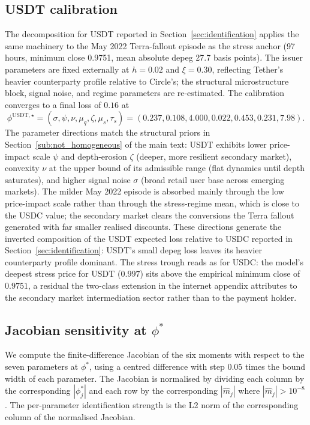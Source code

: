 \subsection{USDT calibration}\label{sub:usdt_calibration}

The decomposition for USDT reported in Section~\ref{sec:identification} applies the same machinery to the May 2022 Terra-fallout episode as the stress anchor (97 hours, minimum close 0.9751, mean absolute depeg 27.7 basis points). The issuer parameters are fixed externally at $h = 0.02$ and $\xi = 0.30$, reflecting Tether's heavier counterparty profile relative to Circle's; the structural microstructure block, signal noise, and regime parameters are re-estimated. The calibration converges to a final loss of $0.16$ at
\begin{equation}\label{eq:phi_star_usdt}
\phi^{\text{USDT},\star} = (\sigma, \psi, \nu, \mu_q, \zeta, \mu_s, \tau_s) = (0.237, 0.108, 4.000, 0.022, 0.453, 0.231, 7.98).
\end{equation}
The parameter directions match the structural priors in Section~\ref{sub:not_homogeneous} of the main text: USDT exhibits lower price-impact scale $\psi$ and depth-erosion $\zeta$ (deeper, more resilient secondary market), convexity $\nu$ at the upper bound of its admissible range (flat dynamics until depth saturates), and higher signal noise $\sigma$ (broad retail user base across emerging markets). The milder May 2022 episode is absorbed mainly through the low price-impact scale rather than through the stress-regime mean, which is close to the USDC value; the secondary market clears the conversions the Terra fallout generated with far smaller realised discounts. These directions generate the inverted composition of the USDT expected loss relative to USDC reported in Section~\ref{sec:identification}: USDT's small depeg loss leaves its heavier counterparty profile dominant. The stress trough reads as for USDC: the model's deepest stress price for USDT ($0.997$) sits above the empirical minimum close of $0.9751$, a residual the two-class extension in the internet appendix attributes to the secondary market intermediation sector rather than to the payment holder.

\subsection{Jacobian sensitivity at $\phi^*$}\label{sub:jacobian}

We compute the finite-difference Jacobian of the six moments with respect to the seven parameters at $\phi^*$, using a centred difference with step $0.05$ times the bound width of each parameter. The Jacobian is normalised by dividing each column by the corresponding $|\phi^*_j|$ and each row by the corresponding $|\hat m_j|$ where $|\hat m_j| > 10^{-8}$. The per-parameter identification strength is the L2 norm of the corresponding column of the normalised Jacobian.


